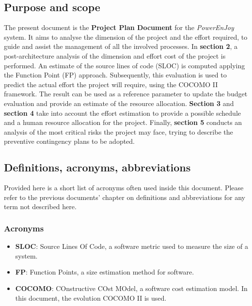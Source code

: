 \subsection{Purpose and scope}
	The present document is the \textbf{Project Plan Document} for the \textit{PowerEnJoy} system. It aims to analyse the dimension of the project and the effort required, to guide and assist the management of all the involved processes. \newline
	In \textbf{section 2}, a post-architecture analysis of the dimension and effort cost of the project is performed. An estimate of the source lines of code (SLOC) is computed applying the Function Point (FP) approach. Subsequently, this evaluation is used to predict the actual effort the project will require, using the COCOMO II framework. The result can be used as a reference parameter to update the budget evaluation and provide an estimate of the resource allocation.\newline
	\textbf{Section 3} and \textbf{section 4} take into account the effort estimation to provide a possible schedule and a human resource allocation for the project.\newline
	Finally, \textbf{section 5} conducts an analysis of the most critical risks the project may face, trying to describe the preventive contingency plans to be adopted.

\subsection{Definitions, acronyms, abbreviations}
	Provided here is a short list of acronyms often used inside this document. Please refer to the previous documents’ chapter on definitions and abbreviations for any term not described here.
	\subsubsection{Acronyms}
		\begin{itemize}
			\item \textbf{SLOC}: Source Lines Of Code, a software metric used to measure the size of a system.
			\item \textbf{FP}: Function Points, a size estimation method for software.
			\item \textbf{COCOMO}: COnstructive COst MOdel, a software cost estimation model. In this document, the evolution COCOMO II is used.
		\end{itemize}

